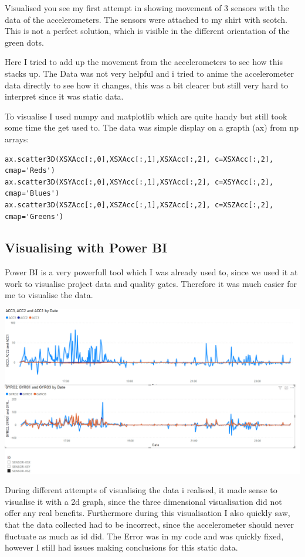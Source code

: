Visualised you see my first attempt in showing movement of 3 sensors with the data of the accelerometers. The sensors were attached to my shirt with scotch. This is not a perfect solution, which is visible in the different orientation of the green dots. 

Here I tried to add up the movement from the accelerometers to see how this stacks up. The Data was not very helpful and i tried to anime the accelerometer data directly to see how it changes, this was a bit clearer but still very hard to interpret since it was static data. 

To visualise I used numpy and matplotlib which are quite handy but still took some time the get used to.
The data was simple display on a grapth (ax) from np arrays:

\begin{lstlisting}
ax.scatter3D(XSXAcc[:,0],XSXAcc[:,1],XSXAcc[:,2], c=XSXAcc[:,2], cmap='Reds')
ax.scatter3D(XSYAcc[:,0],XSYAcc[:,1],XSYAcc[:,2], c=XSYAcc[:,2], cmap='Blues')
ax.scatter3D(XSZAcc[:,0],XSZAcc[:,1],XSZAcc[:,2], c=XSZAcc[:,2], cmap='Greens')
\end{lstlisting}

\subsection{Visualising with Power BI}

Power BI is a very powerfull tool which I was already used to, since we used it at work to visualise project data and quality gates. Therefore it was much easier for me to visualise the data.

\includegraphics[width=\linewidth]{images/PowerBIVisualisiation.png}

During different attempts of visualising the data i realised, it made sense to visualise it with a 2d graph, since the three dimensional visualisation did not offer any real benefits. Furthermore during this visualisation I also quickly saw, that the data collected had to be incorrect, since the accelerometer should never fluctuate as much as id did. The Error was in my code and was quickly fixed, however I still had issues making conclusions for this static data.

